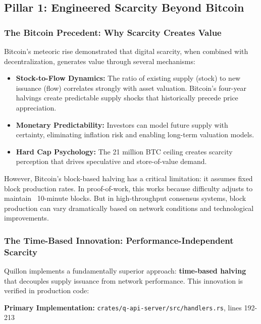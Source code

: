 \documentclass[11pt,a4paper]{article}
\begin{document}
\subsection{Pillar 1: Engineered Scarcity Beyond Bitcoin}

\subsubsection{The Bitcoin Precedent: Why Scarcity Creates Value}

Bitcoin's meteoric rise demonstrated that digital scarcity, when combined with decentralization, generates value through several mechanisms:

\begin{itemize}[leftmargin=*]
\item \textbf{Stock-to-Flow Dynamics:} The ratio of existing supply (stock) to new issuance (flow) correlates strongly with asset valuation. Bitcoin's four-year halvings create predictable supply shocks that historically precede price appreciation.

\item \textbf{Monetary Predictability:} Investors can model future supply with certainty, eliminating inflation risk and enabling long-term valuation models.

\item \textbf{Hard Cap Psychology:} The 21 million BTC ceiling creates scarcity perception that drives speculative and store-of-value demand.
\end{itemize}

However, Bitcoin's block-based halving has a critical limitation: it assumes fixed block production rates. In proof-of-work, this works because difficulty adjusts to maintain ~10-minute blocks. But in high-throughput consensus systems, block production can vary dramatically based on network conditions and technological improvements.

\subsubsection{The Time-Based Innovation: Performance-Independent Scarcity}

Quillon implements a fundamentally superior approach: \textbf{time-based halving} that decouples supply issuance from network performance. This innovation is verified in production code:

\textbf{Primary Implementation:} \texttt{crates/q-api-server/src/handlers.rs}, lines 192-213
\end{document}
